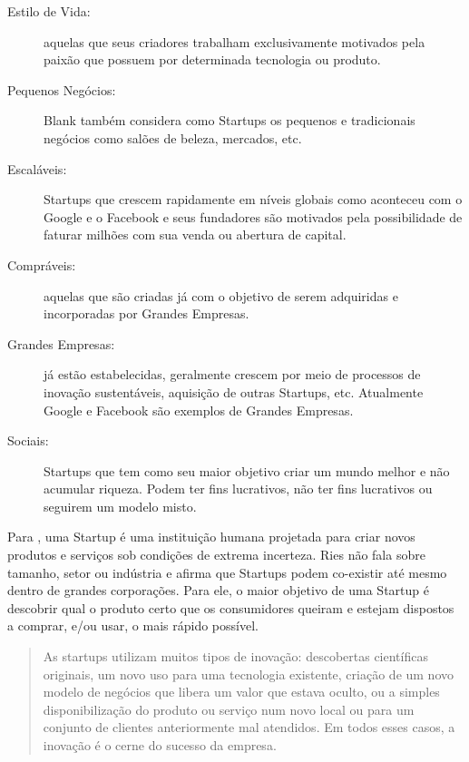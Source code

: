 \begin{description}
	\item [Estilo de Vida:] aquelas que seus criadores trabalham exclusivamente motivados pela paixão que possuem por determinada tecnologia ou produto.

	\item [Pequenos Negócios:] Blank também considera como Startups os pequenos e tradicionais negócios como salões de beleza, mercados, etc.

	\item [Escaláveis:] Startups que crescem rapidamente em níveis globais como aconteceu com o Google e o Facebook e seus fundadores são motivados pela possibilidade de faturar milhões com sua venda ou abertura de capital.

	\item [Compráveis:] aquelas que são criadas já com o objetivo de serem adquiridas e incorporadas por Grandes Empresas.

	\item [Grandes Empresas:] já estão estabelecidas, geralmente crescem por meio de processos de inovação sustentáveis, aquisição de outras Startups, etc. Atualmente Google e Facebook são exemplos de Grandes Empresas.

	\item [Sociais:] Startups que tem como seu maior objetivo criar um mundo melhor e não acumular riqueza. Podem ter fins lucrativos, não ter fins lucrativos ou seguirem um modelo misto.
\end{description}

Para , uma Startup é uma instituição humana projetada para criar novos produtos e serviços sob condições de extrema incerteza. Ries não fala sobre tamanho, setor ou indústria e afirma que Startups podem co-existir até mesmo dentro de grandes corporações. Para ele, o maior objetivo de uma Startup é descobrir qual o produto certo que os consumidores queiram e estejam dispostos a comprar, e/ou usar, o mais rápido possível. 

\begin{quote}
As startups utilizam muitos tipos de inovação: descobertas científicas originais, um novo uso para uma tecnologia existente, criação de um novo modelo de negócios que libera um valor que estava oculto, ou a simples disponibilização do produto ou serviço num novo local ou para um conjunto de clientes anteriormente mal atendidos. Em todos esses casos, a inovação é o cerne do sucesso da empresa. \cite{Ries2011}
\end{quote}

